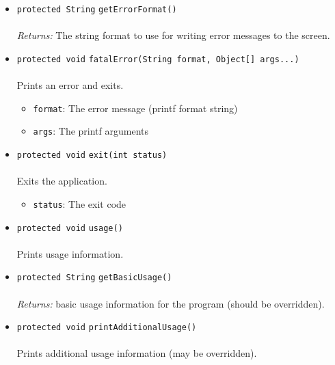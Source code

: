 \begin{itemize}
\item \lstinline|protected String| \lstinline|getErrorFormat|\lstinline|()|\\ \\[-0.6em]
\emph{Returns:} The string format to use for writing error messages to the
 screen.



\item \lstinline|protected void| \lstinline|fatalError|\lstinline|(String format, Object[] args...)|\\ \\[-0.6em]
Prints an error and exits.
\begin{itemize}
\item \lstinline|format|: The error message (printf format string)
\item \lstinline|args|: The printf arguments
\end{itemize}



\item \lstinline|protected void| \lstinline|exit|\lstinline|(int status)|\\ \\[-0.6em]
Exits the application.
\begin{itemize}
\item \lstinline|status|: The exit code
\end{itemize}



\item \lstinline|protected void| \lstinline|usage|\lstinline|()|\\ \\[-0.6em]
Prints usage information.



\item \lstinline|protected String| \lstinline|getBasicUsage|\lstinline|()|\\ \\[-0.6em]
\emph{Returns:} basic usage information for the program (should be overridden).



\item \lstinline|protected void| \lstinline|printAdditionalUsage|\lstinline|()|\\ \\[-0.6em]
Prints additional usage information (may be overridden).



\end{itemize}

